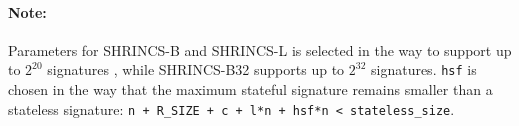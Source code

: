 \paragraph{Note:} Parameters for SHRINCS-B and SHRINCS-L is selected in the way to support up to $2^{20}$ signatures \cite{kudinov_nick_2025_hbs_bitcoin}, while SHRINCS-B32 supports up to $2^{32}$ signatures. \texttt{hsf} is chosen in the way that the maximum stateful signature remains smaller than a stateless signature: \texttt{n + R\_SIZE + c + l*n + hsf*n < stateless\_size}.